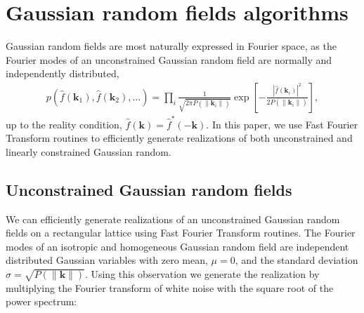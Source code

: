 \documentclass[a4paper, 11pt]{article}
\begin{document}
%




\appendix
\section{Gaussian random fields algorithms}\label{ap:GRF}
Gaussian random fields are most naturally expressed in Fourier space, as the Fourier modes of an unconstrained Gaussian random field are normally and independently distributed, 
\begin{align}
p(\hat{f}(\bm{k}_1), \hat{f}(\bm{k}_2), \dots) = \prod_{i} \frac{1}{\sqrt{2\pi P(\| \bm{k}_i\|)}} \exp\left[-\frac{|\hat{f}(\bm{k}_i)|^2}{2P(\|\bm{k}_i\|)}\right],
\end{align}
up to the reality condition, $\hat{f}(\bm{k})=\hat{f}^*(-\bm{k})$. In this paper, we use Fast Fourier Transform routines to efficiently generate realizations of both unconstrained and linearly constrained Gaussian random.

\subsection{Unconstrained Gaussian random fields}
We can efficiently generate realizations of an unconstrained Gaussian random fields on a rectangular lattice using Fast Fourier Transform routines. The Fourier modes of an isotropic and homogeneous Gaussian random field are independent distributed Gaussian variables with zero mean, $\mu=0$, and the standard deviation $\sigma = \sqrt{P(\|\bm{k}\|)}$. Using this observation we generate the realization by multiplying the Fourier transform of white noise with the square root of the power spectrum:\\
\end{document}
